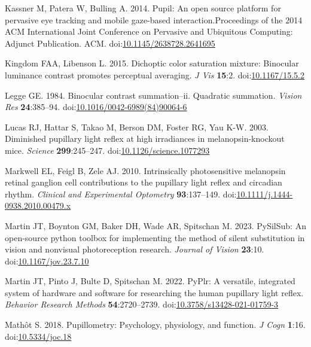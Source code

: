 \documentclass[
]{article}
\begin{document}
\leavevmode\hypertarget{ref-Kassner2014}{}%
Kassner M, Patera W, Bulling A. 2014. Pupil: An open source platform for pervasive eye tracking and mobile gaze-based interaction.Proceedings of the 2014 ACM International Joint Conference on Pervasive and Ubiquitous Computing: Adjunct Publication. ACM. doi:\href{https://doi.org/10.1145/2638728.2641695}{10.1145/2638728.2641695}

\leavevmode\hypertarget{ref-Kingdom2015}{}%
Kingdom FAA, Libenson L. 2015. Dichoptic color saturation mixture: Binocular luminance contrast promotes perceptual averaging. \emph{J Vis} \textbf{15}:2. doi:\href{https://doi.org/10.1167/15.5.2}{10.1167/15.5.2}

\leavevmode\hypertarget{ref-Legge1984}{}%
Legge GE. 1984. Binocular contrast summation--ii. Quadratic summation. \emph{Vision Res} \textbf{24}:385--94. doi:\href{https://doi.org/10.1016/0042-6989(84)90064-6}{10.1016/0042-6989(84)90064-6}

\leavevmode\hypertarget{ref-Lucas2003}{}%
Lucas RJ, Hattar S, Takao M, Berson DM, Foster RG, Yau K-W. 2003. Diminished pupillary light reflex at high irradiances in melanopsin-knockout mice. \emph{Science} \textbf{299}:245--247. doi:\href{https://doi.org/10.1126/science.1077293}{10.1126/science.1077293}

\leavevmode\hypertarget{ref-Markwell2010}{}%
Markwell EL, Feigl B, Zele AJ. 2010. Intrinsically photosensitive melanopsin retinal ganglion cell contributions to the pupillary light reflex and circadian rhythm. \emph{Clinical and Experimental Optometry} \textbf{93}:137--149. doi:\href{https://doi.org/10.1111/j.1444-0938.2010.00479.x}{10.1111/j.1444-0938.2010.00479.x}

\leavevmode\hypertarget{ref-Martin2023}{}%
Martin JT, Boynton GM, Baker DH, Wade AR, Spitschan M. 2023. PySilSub: An open-source python toolbox for implementing the method of silent substitution in vision and nonvisual photoreception research. \emph{Journal of Vision} \textbf{23}:10. doi:\href{https://doi.org/10.1167/jov.23.7.10}{10.1167/jov.23.7.10}

\leavevmode\hypertarget{ref-Martin2022}{}%
Martin JT, Pinto J, Bulte D, Spitschan M. 2022. PyPlr: A versatile, integrated system of hardware and software for researching the human pupillary light reflex. \emph{Behavior Research Methods} \textbf{54}:2720--2739. doi:\href{https://doi.org/10.3758/s13428-021-01759-3}{10.3758/s13428-021-01759-3}

\leavevmode\hypertarget{ref-Mathot2018}{}%
Mathôt S. 2018. Pupillometry: Psychology, physiology, and function. \emph{J Cogn} \textbf{1}:16. doi:\href{https://doi.org/10.5334/joc.18}{10.5334/joc.18}
\end{document}
